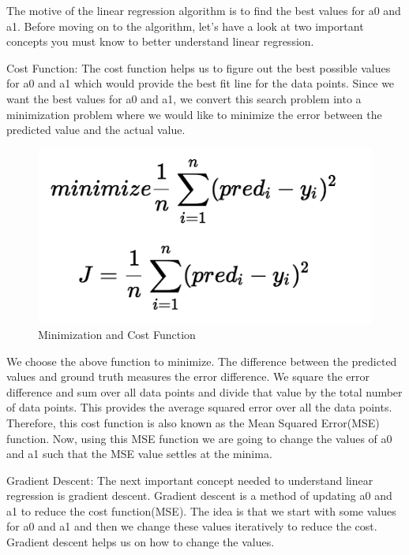 \begin{itemize}
        The motive of the linear regression algorithm is to find the best values for a0 and a1. Before moving on to the algorithm, let’s have a look at two important concepts you must know to better understand linear regression.
        
        \clearpage
        Cost Function: The cost function helps us to figure out the best possible values for a0 and a1 which would provide the best fit line for the data points. Since we want the best values for a0 and a1, we convert this search problem into a minimization problem where we would like to minimize the error between the predicted value and the actual value.
        
                \begin{figure}[htbp]
                    \centering
	                \includegraphics[scale=0.5]{Figures/costfn.png}
		            \caption[Minimization and Cost Function]{Minimization and Cost Function}
	                \label{fig:Minimization and Cost Function}
                \end{figure}
                
        We choose the above function to minimize. The difference between the predicted values and ground truth measures the error difference. We square the error difference and sum over all data points and divide that value by the total number of data points. This provides the average squared error over all the data points. Therefore, this cost function is also known as the Mean Squared Error(MSE) function. Now, using this MSE function we are going to change the values of a0 and a1 such that the MSE value settles at the minima.
        
        Gradient Descent: The next important concept needed to understand linear regression is gradient descent. Gradient descent is a method of updating a0 and a1 to reduce the cost function(MSE). The idea is that we start with some values for a0 and a1 and then we change these values iteratively to reduce the cost. Gradient descent helps us on how to change the values.


\end{itemize}
